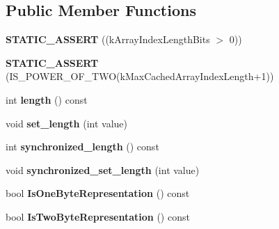 \subsection*{Public Member Functions}
\begin{DoxyCompactItemize}
\item 
\hypertarget{classv8_1_1internal_1_1_string_a30bd067ab1a3a3d754545ba0b528942e}{}{\bfseries S\+T\+A\+T\+I\+C\+\_\+\+A\+S\+S\+E\+R\+T} ((k\+Array\+Index\+Length\+Bits $>$ 0))\label{classv8_1_1internal_1_1_string_a30bd067ab1a3a3d754545ba0b528942e}

\item 
\hypertarget{classv8_1_1internal_1_1_string_a5731556164819f9e52c0a5a5b48e9a98}{}{\bfseries S\+T\+A\+T\+I\+C\+\_\+\+A\+S\+S\+E\+R\+T} (I\+S\+\_\+\+P\+O\+W\+E\+R\+\_\+\+O\+F\+\_\+\+T\+W\+O(k\+Max\+Cached\+Array\+Index\+Length+1))\label{classv8_1_1internal_1_1_string_a5731556164819f9e52c0a5a5b48e9a98}

\item 
\hypertarget{classv8_1_1internal_1_1_string_afafbcf4c49212b4ded7592db4c44ca66}{}int {\bfseries length} () const \label{classv8_1_1internal_1_1_string_afafbcf4c49212b4ded7592db4c44ca66}

\item 
\hypertarget{classv8_1_1internal_1_1_string_aea8a5dad8c9c793594ea3f94c02e6402}{}void {\bfseries set\+\_\+length} (int value)\label{classv8_1_1internal_1_1_string_aea8a5dad8c9c793594ea3f94c02e6402}

\item 
\hypertarget{classv8_1_1internal_1_1_string_a18dd6c1f53a296eaad0b86bae64c1382}{}int {\bfseries synchronized\+\_\+length} () const \label{classv8_1_1internal_1_1_string_a18dd6c1f53a296eaad0b86bae64c1382}

\item 
\hypertarget{classv8_1_1internal_1_1_string_a70a34e89d4553f90cb58c268c3893433}{}void {\bfseries synchronized\+\_\+set\+\_\+length} (int value)\label{classv8_1_1internal_1_1_string_a70a34e89d4553f90cb58c268c3893433}

\item 
\hypertarget{classv8_1_1internal_1_1_string_a882e550aee3e5496ea38760b60ed5c43}{}bool {\bfseries Is\+One\+Byte\+Representation} () const \label{classv8_1_1internal_1_1_string_a882e550aee3e5496ea38760b60ed5c43}

\item 
\hypertarget{classv8_1_1internal_1_1_string_a7d76b1d14148532f91e8e39b579da7c4}{}bool {\bfseries Is\+Two\+Byte\+Representation} () const \label{classv8_1_1internal_1_1_string_a7d76b1d14148532f91e8e39b579da7c4}


\end{DoxyCompactItemize}
